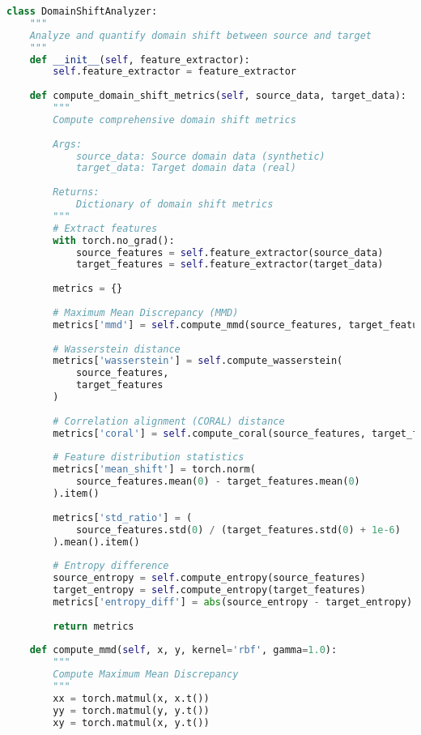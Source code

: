 \documentclass[journal]{IEEEtran}
\begin{document}
\begin{lstlisting}[language=Python, caption=Domain Shift Quantification]
class DomainShiftAnalyzer:
    """
    Analyze and quantify domain shift between source and target
    """
    def __init__(self, feature_extractor):
        self.feature_extractor = feature_extractor
        
    def compute_domain_shift_metrics(self, source_data, target_data):
        """
        Compute comprehensive domain shift metrics
        
        Args:
            source_data: Source domain data (synthetic)
            target_data: Target domain data (real)
        
        Returns:
            Dictionary of domain shift metrics
        """
        # Extract features
        with torch.no_grad():
            source_features = self.feature_extractor(source_data)
            target_features = self.feature_extractor(target_data)
        
        metrics = {}
        
        # Maximum Mean Discrepancy (MMD)
        metrics['mmd'] = self.compute_mmd(source_features, target_features)
        
        # Wasserstein distance
        metrics['wasserstein'] = self.compute_wasserstein(
            source_features, 
            target_features
        )
        
        # Correlation alignment (CORAL) distance
        metrics['coral'] = self.compute_coral(source_features, target_features)
        
        # Feature distribution statistics
        metrics['mean_shift'] = torch.norm(
            source_features.mean(0) - target_features.mean(0)
        ).item()
        
        metrics['std_ratio'] = (
            source_features.std(0) / (target_features.std(0) + 1e-6)
        ).mean().item()
        
        # Entropy difference
        source_entropy = self.compute_entropy(source_features)
        target_entropy = self.compute_entropy(target_features)
        metrics['entropy_diff'] = abs(source_entropy - target_entropy)
        
        return metrics
    
    def compute_mmd(self, x, y, kernel='rbf', gamma=1.0):
        """
        Compute Maximum Mean Discrepancy
        """
        xx = torch.matmul(x, x.t())
        yy = torch.matmul(y, y.t())
        xy = torch.matmul(x, y.t())
        

\end{lstlisting}
\end{document}
